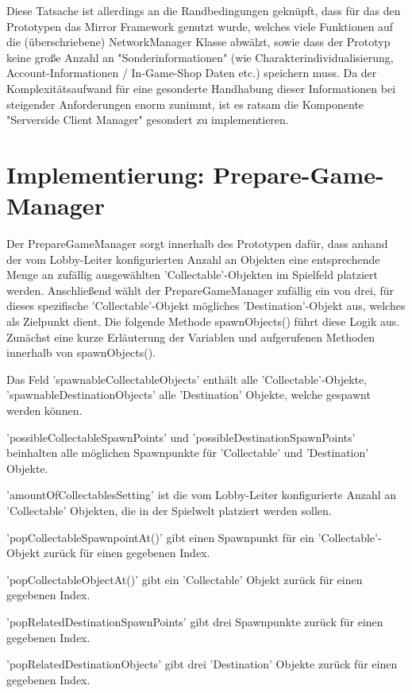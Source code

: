 Diese Tatsache ist allerdings an die Randbedingungen geknüpft, dass für das den Prototypen das Mirror Framework genutzt wurde, welches viele Funktionen auf die (überschriebene) NetworkManager Klasse abwälzt, sowie dass der Prototyp keine große Anzahl an "Sonderinformationen" (wie Charakterindividualisierung, Account-Informationen / In-Game-Shop Daten etc.) speichern muss. Da der Komplexitätsaufwand für eine gesonderte Handhabung dieser Informationen bei steigender Anforderungen enorm zunimmt, ist es ratsam die Komponente "Serverside Client Manager" gesondert zu implementieren.

\section{Implementierung: Prepare-Game-Manager}

Der PrepareGameManager sorgt innerhalb des Prototypen dafür, dass anhand der vom Lobby-Leiter konfigurierten Anzahl an Objekten eine entsprechende Menge an zufällig ausgewählten 'Collectable'-Objekten im Spielfeld platziert werden. Anschließend wählt der PrepareGameManager zufällig ein von drei, für dieses spezifische 'Collectable'-Objekt mögliches 'Destination'-Objekt aus, welches als Zielpunkt dient. Die folgende Methode spawnObjects() führt diese Logik aus. Zunächst eine kurze Erläuterung der Variablen und aufgerufenen Methoden innerhalb von spawnObjects().

Das Feld 'spawnableCollectableObjects' enthält alle 'Collectable'-Objekte, 'spawnableDestinationObjects' alle 'Destination' Objekte, welche gespawnt werden können.

'possibleCollectableSpawnPoints' und 'possibleDestinationSpawnPoints' beinhalten alle möglichen Spawnpunkte für 'Collectable' und 'Destination' Objekte.

'amountOfCollectablesSetting' ist die vom Lobby-Leiter konfigurierte Anzahl an 'Collectable' Objekten, die in der Spielwelt platziert werden sollen.

'popCollectableSpawnpointAt()' gibt einen Spawnpunkt für ein 'Collectable'-Objekt zurück für einen gegebenen Index.

'popCollectableObjectAt()' gibt ein 'Collectable' Objekt zurück für einen gegebenen Index.

'popRelatedDestinationSpawnPoints' gibt drei Spawnpunkte zurück für einen gegebenen Index.

'popRelatedDestinationObjects' gibt drei 'Destination' Objekte zurück für einen gegebenen Index.



